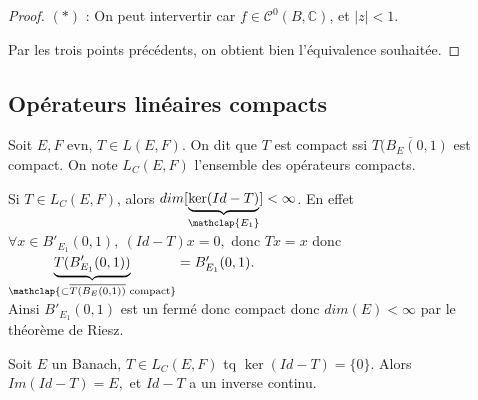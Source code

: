 \begin{proof}
$(*)$ : On peut intervertir car $f \in \mathcal{C}^0(B,\mathbb{C})$, et $|z| < 1$.

Par les trois points précédents, on obtient bien l'équivalence souhaitée.

\end{proof}


\subsection{Opérateurs linéaires compacts}
\begin{definition}
    Soit $E,F$ evn, $T\in L(E,F)$. On dit que $T$ est compact ssi $\overline{T(B_E(0,1)}$ est compact. On note $L_C(E,F)$ l'ensemble des opérateurs compacts.
\end{definition}

\begin{remarque}
    Si $T\in L_C(E,F)$, alors $dim[\underbrace{\ker(Id-T)}_{\mathclap{E_1}}]<\infty $. En effet $\forall x\in B'_{E_1}(0,1),\ (Id-T)x=0, $ donc $Tx=x$ donc $\underbrace{T(B'_{E_1}(0,1))}_{\mathclap{\subset \overline{T(B_E(0,1))}\text{ compact}}}=B'_{E_1}(0,1).$ \\
    Ainsi $B'_{E_1}(0,1)$ est un fermé donc compact donc $dim(E)<\infty $ par le théorème de Riesz.
\end{remarque}
\begin{theoreme}
    Soit $E$ un Banach, $T\in L_C(E,F)$ tq $\ker(Id-T)=\{0\} .$ Alors $Im(Id-T)=E,$ et $Id-T$ a un inverse continu.
\end{theoreme}
